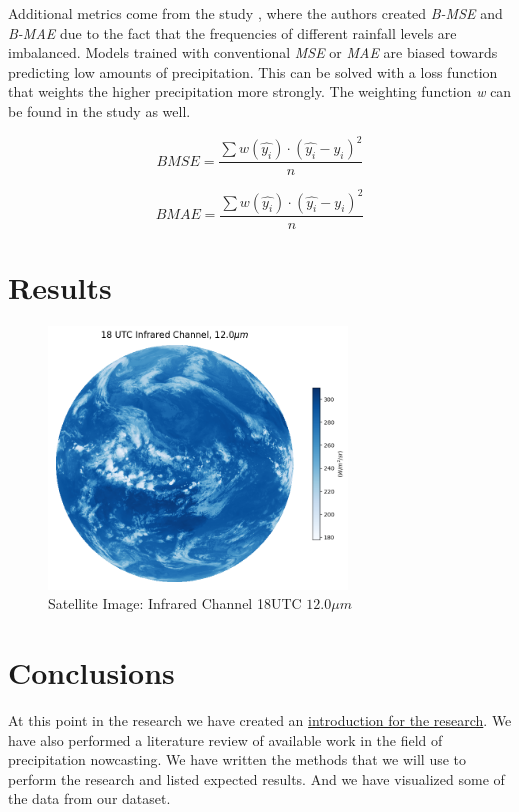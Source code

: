 \documentclass[acmtog, authorversion]{acmart}
\begin{document}
Additional metrics come from the study \cite{shi2017deep}, where the authors created \textit{B-MSE} and \textit{B-MAE} due to the fact that the frequencies of different rainfall levels are imbalanced. Models trained with conventional \textit{MSE} or \textit{MAE} are biased towards predicting low amounts of precipitation. This can be solved with a loss function that weights the higher precipitation more strongly. The weighting function \textit{w} can be found in the study as well.

\begin{equation}
BMSE = \frac{\sum w(\hat{y_i}) \cdot (\hat{y_i} -y_i)^2}{n}
\end{equation}

\begin{equation}
BMAE = \frac{\sum w(\hat{y_i})  \cdot (\hat{y_i} -y_i)^2}{n}
\end{equation}


\section{Results}


\begin{figure}
    \centering
    \includegraphics[width=225pt]{./images/infrared.png}
    \caption{Satellite Image: Infrared Channel 18UTC $12.0\mu m$}
    \label{fig:infra}
\end{figure}


\section{Conclusions}
At this point in the research we have created an \hyperref[introduction]{introduction for the research}. We have also performed a literature review of available work in the field of precipitation nowcasting. We have written the methods that we will use to perform the research and listed expected results. And we have visualized some of the data from our dataset.
\end{document}
